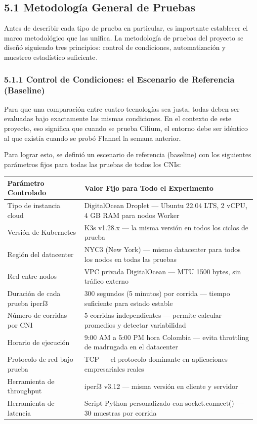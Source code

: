 \documentclass[journal]{IEEEtran}
\begin{document}
\subsection{5.1 Metodología General de Pruebas}

Antes de describir cada tipo de prueba en particular, es importante establecer el marco metodológico que las unifica. La metodología de pruebas del proyecto se diseñó siguiendo tres principios: control de condiciones, automatización y muestreo estadístico suficiente.

\subsubsection{5.1.1 Control de Condiciones: el Escenario de Referencia (Baseline)}

Para que una comparación entre cuatro tecnologías sea justa, todas deben ser evaluadas bajo exactamente las mismas condiciones. En el contexto de este proyecto, eso significa que cuando se prueba Cilium, el entorno debe ser idéntico al que existía cuando se probó Flannel la semana anterior.

Para lograr esto, se definió un escenario de referencia (baseline) con los siguientes parámetros fijos para todas las pruebas de todos los CNIs:

\begin{table}[htbp]
\centering
\scriptsize
\begin{tabularx}{\textwidth}{|Y|Y|}
\hline
\textbf{Parámetro Controlado} & \textbf{Valor Fijo para Todo el Experimento} \\
\hline
Tipo de instancia cloud & DigitalOcean Droplet --- Ubuntu 22.04 LTS, 2 vCPU, 4 GB RAM para nodos Worker \\
Versión de Kubernetes & K3s v1.28.x --- la misma versión en todos los ciclos de prueba \\
Región del datacenter & NYC3 (New York) --- mismo datacenter para todos los nodos en todas las pruebas \\
Red entre nodos & VPC privada DigitalOcean --- MTU 1500 bytes, sin tráfico externo \\
Duración de cada prueba iperf3 & 300 segundos (5 minutos) por corrida --- tiempo suficiente para estado estable \\
Número de corridas por CNI & 5 corridas independientes --- permite calcular promedios y detectar variabilidad \\
Horario de ejecución & 9:00 AM a 5:00 PM hora Colombia --- evita throttling de madrugada en el datacenter \\
Protocolo de red bajo prueba & TCP --- el protocolo dominante en aplicaciones empresariales reales \\
Herramienta de throughput & iperf3 v3.12 --- misma versión en cliente y servidor \\
Herramienta de latencia & Script Python personalizado con socket.connect() --- 30 muestras por corrida \\
\hline
\end{tabularx}
\end{table}
\end{document}
